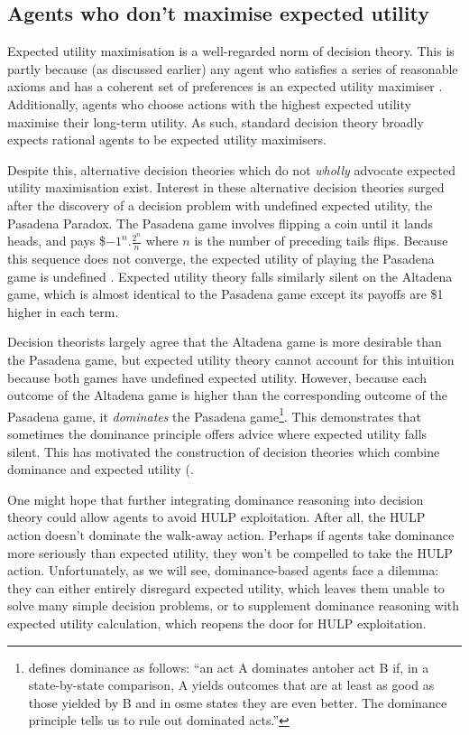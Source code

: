 \documentclass{article}
\begin{document}
\subsection{Agents who don't maximise expected utility}

Expected utility maximisation is a well-regarded norm of decision theory. This is partly because (as discussed earlier) any agent who satisfies a series of reasonable axioms and has a coherent set of preferences is an expected utility maximiser \citep{von1944games}. Additionally, agents who choose actions with the highest expected utility maximise their long-term utility. As such, standard decision theory broadly expects rational agents to be expected utility maximisers.

Despite this, alternative decision theories which do not \textit{wholly} advocate expected utility maximisation exist. Interest in these alternative decision theories surged after the discovery of a decision problem with undefined expected utility, the Pasadena Paradox. The Pasadena game involves flipping a coin until it lands heads, and pays \$\(-1^n.\frac{2^n}{n}\) where \(n\) is the number of preceding tails flips. Because this sequence does not converge, the expected utility of playing the Pasadena game is undefined \citep{nover2004vexing}. Expected utility theory falls similarly silent on the Altadena game, which is almost identical to the Pasadena game except its payoffs are \$1 higher in each term.

Decision theorists largely agree that the Altadena game is more desirable than the Pasadena game, but expected utility theory cannot account for this intuition because both games have undefined expected utility. However, because each outcome of the Altadena game is higher than the corresponding outcome of the Pasadena game, it \textit{dominates} the Pasadena game\footnote{\citep[pg. 9]{resnik1987choices} defines dominance as follows: ``an act A dominates antoher act B if, in a state-by-state comparison, A yields outcomes that are at least as good as those yielded by B and in osme states they are even better. The dominance principle tells us to rule out dominated acts.''}. This demonstrates that sometimes the dominance principle offers advice where expected utility falls silent. This has motivated the construction of decision theories which combine dominance and expected utility (\citep{easwaran2009dominance, colyvan2008relative, colyvan2006no}.

One might hope that further integrating dominance reasoning into decision theory could allow agents to avoid HULP exploitation. After all, the HULP action doesn't dominate the walk-away action. Perhaps if agents take dominance more seriously than expected utility, they won't be compelled to take the HULP action. Unfortunately, as we will see, dominance-based agents face a dilemma: they can either entirely disregard expected utility, which leaves them unable to solve many simple decision problems, or to supplement dominance reasoning with expected utility calculation, which reopens the door for HULP exploitation.
\end{document}
